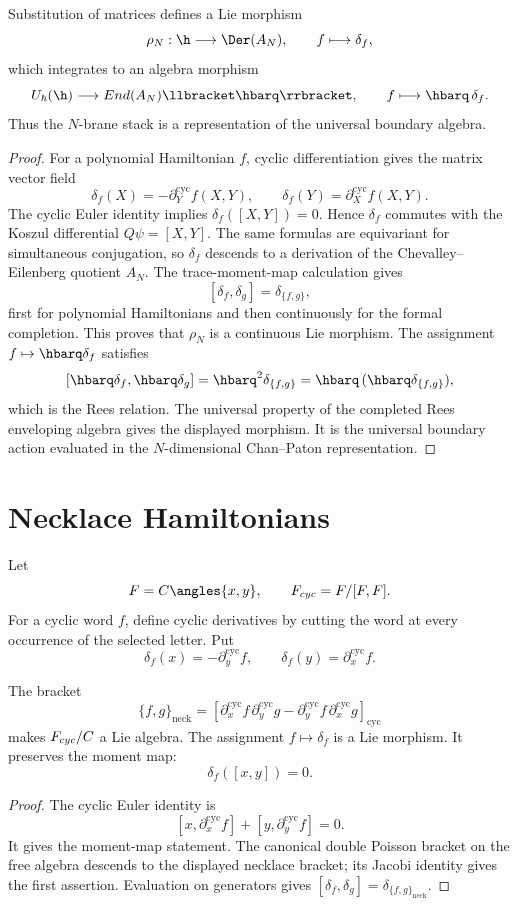 \begin{proposition}
Substitution of matrices defines a Lie morphism
\[
 \rho_N:\h\longrightarrow\Der(A_N),
 \qquad
 f\longmapsto\delta_f,
\]
which integrates to an algebra morphism
\[
 \widehat U_\hbar(\h)\longrightarrow\End(A_N)\llbracket\hbarq\rrbracket,
 \qquad f\longmapsto\hbarq\,\delta_f.
\]
Thus the $N$-brane stack is a representation of the universal boundary algebra.
\end{proposition}
\begin{proof}
For a polynomial Hamiltonian $f$, cyclic differentiation gives the matrix vector field
\[
 \delta_f(X)=-\partial_Y^{\mathrm{cyc}}f(X,Y),
 \qquad
 \delta_f(Y)=\partial_X^{\mathrm{cyc}}f(X,Y).
\]
The cyclic Euler identity implies $\delta_f([X,Y])=0$.  Hence $\delta_f$ commutes with the Koszul differential $Q\psi=[X,Y]$.  The same formulas are equivariant for simultaneous conjugation, so $\delta_f$ descends to a derivation of the Chevalley--Eilenberg quotient $A_N$.  The trace-moment-map calculation gives
\[
 [\delta_f,\delta_g]=\delta_{\{f,g\}},
\]
first for polynomial Hamiltonians and then continuously for the formal completion.  This proves that $\rho_N$ is a continuous Lie morphism.  The assignment $f\mapsto\hbarq\delta_f$ satisfies
\[
 [\hbarq\delta_f,\hbarq\delta_g]
 =\hbarq^2\delta_{\{f,g\}}
 =\hbarq\,(\hbarq\delta_{\{f,g\}}),
\]
which is the Rees relation.  The universal property of the completed Rees enveloping algebra gives the displayed morphism.  It is the universal boundary action evaluated in the $N$-dimensional Chan--Paton representation.
\end{proof}

\chapter{Necklace Hamiltonians}
Let
\[
 F=\C\angles{x,y},
 \qquad
 F_{\mathrm{cyc}}=F/[F,F].
\]
For a cyclic word $f$, define cyclic derivatives by cutting the word at every occurrence of the selected letter.  Put
\[
 \delta_f(x)=-\partial_y^{\mathrm{cyc}}f,
 \qquad
 \delta_f(y)=\partial_x^{\mathrm{cyc}}f.
\]

\begin{theorem}
The bracket
\[
 \{f,g\}_{\mathrm{neck}}
 =\left[
 \partial_x^{\mathrm{cyc}}f\,
 \partial_y^{\mathrm{cyc}}g-
 \partial_y^{\mathrm{cyc}}f\,
 \partial_x^{\mathrm{cyc}}g
 \right]_{\mathrm{cyc}}
\]
makes $F_{cyc}/C$ a Lie algebra.  The assignment $f\mapsto\delta_f$ is a Lie morphism.  It preserves the moment map:
\[
 \delta_f([x,y])=0.
\]
\end{theorem}
\begin{proof}
The cyclic Euler identity is
\[
 [x,\partial_x^{\mathrm{cyc}}f]+[y,\partial_y^{\mathrm{cyc}}f]=0.
\]
It gives the moment-map statement.  The canonical double Poisson bracket on the free algebra descends to the displayed necklace bracket; its Jacobi identity gives the first assertion.  Evaluation on generators gives $[\delta_f,\delta_g]=\delta_{\{f,g\}_{\mathrm{neck}}}$.
\end{proof}

